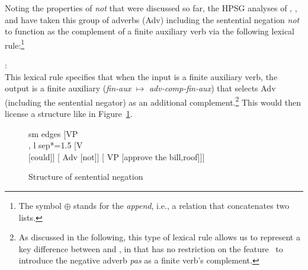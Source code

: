 \documentclass[output=paper
 	        ,biblatex
                ,babelshorthands
                ,newtxmath
                ,draftmode
                ,colorlinks, citecolor=brown
]{langscibook}
\begin{document}
\begin{exe}
\begin{xlist}
\begin{exe}
\begin{xlist}
Noting the properties of \emph{not} that were discussed so far,
the HPSG analyses of \citet{AG:97}, \citet{Kim:00}, and \citet{Warner2000a-u}
have taken this group of adverbs (Adv) including the sentential negation \emph{not}
to function as the complement of a finite auxiliary verb via the following lexical
rule:\footnote{The symbol $\oplus$ stands for the  \emph{append}, i.e., a relation
  that concatenates two lists. }

\ea
{}:\\
\z
%
This lexical rule specifies that when the input is a finite auxiliary verb,
the output is a finite auxiliary (\textit{fin-aux} $\mapsto$ \textit{adv-comp-fin-aux})
that selects Adv (including the sentential negator) as an additional complement.\footnote{As discussed in the following, this type of lexical rule allows us
to represent a key difference between  and , in that
 has no restriction on the feature \AUX\ to introduce the negative
adverb {\it pas}
as a finite verb's complement.}  This would then
license a structure like in Figure~\ref{negation-fig:6}.


\begin{figure}
	\begin{forest}
		sm edges
		[VP\\
		, l sep*=1.5
			[V\\
				[could]]
			[ Adv
				[not]]
			[ VP
				[approve the bill,roof]]]
	\end{forest}
\caption{Structure of sentential negation}\label{negation-fig:6}
\end{figure}


\end{xlist}
\end{exe}
\end{xlist}
\end{exe}
\end{document}
